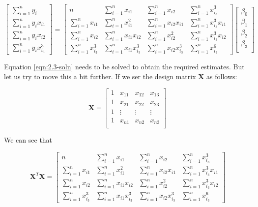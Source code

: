 \documentclass[]{article}
\begin{document}
\begin{equation}
\label{eqn:2.3-soln}
	\begin{bmatrix}
		\sum_{i=1}^{n}y_i \\
		\sum_{i=1}^{n}y_ix_{i1}\\
		\sum_{i=1}^{n}y_ix_{i2}\\
		\sum_{i=1}^{n}y_ix_{i_3}^3
	\end{bmatrix}
	=
	\begin{bmatrix}
		n  							& \sum_{i=1}^{n} x_{i1} 			& \sum_{i=1}^{n} x_{i2} 			& \sum_{i=1}^{n} x_{i_3}^3 \\
		\sum_{i=1}^{n} x_{i1}  		& \sum_{i=1}^{n} x_{i1}^2 			& \sum_{i=1}^{n} x_{i2}x_{i1}		& \sum_{i=1}^{n} x_{i_3}^3x_{i1} \\
		\sum_{i=1}^{n} x_{i2}  		& \sum_{i=1}^{n} x_{i1}x_{i2} 		& \sum_{i=1}^{n} x_{i2}^2 			& \sum_{i=1}^{n} x_{i_3}^3x_{i2} \\
		\sum_{i=1}^{n} x_{i_3}^3	& \sum_{i=1}^{n} x_{i1}x_{i_3}^3 	& \sum_{i=1}^{n} x_{i2}x_{i_3}^3 	& \sum_{i=1}^{n} x_{i_3}^6
	\end{bmatrix}
	\begin{bmatrix}
		\beta_0\\
		\beta_1\\
		\beta_2\\
		\beta_3\\
	\end{bmatrix}
\end{equation}


\noindent Equation \ref{eqn:2.3-soln} needs to be solved to obtain the required estimates. But let us try to move this a bit further. If we ser the design matrix $\textbf{X}$ as follows:

$$
\textbf{X}
=
\begin{bmatrix}
1	& x_{11}	& x_{12}	& x_{13} \\
1	& x_{21}	& x_{22}	& x_{23} \\
1	& \vdots	& \vdots	& \vdots \\
1	& x_{n1}	& x_{n2}	& x_{n3} \\
\end{bmatrix}
$$

\noindent We can see that

$$
\textbf{X}^T \textbf{X}
=
\begin{bmatrix}
	n  							& \sum_{i=1}^{n} x_{i1} 			& \sum_{i=1}^{n} x_{i2} 			& \sum_{i=1}^{n} x_{i_3}^3 \\
	\sum_{i=1}^{n} x_{i1}  		& \sum_{i=1}^{n} x_{i1}^2 			& \sum_{i=1}^{n} x_{i2}x_{i1}		& \sum_{i=1}^{n} x_{i_3}^3x_{i1} \\
	\sum_{i=1}^{n} x_{i2}  		& \sum_{i=1}^{n} x_{i1}x_{i2} 		& \sum_{i=1}^{n} x_{i2}^2 			& \sum_{i=1}^{n} x_{i_3}^3x_{i2} \\
	\sum_{i=1}^{n} x_{i_3}^3	& \sum_{i=1}^{n} x_{i1}x_{i_3}^3 	& \sum_{i=1}^{n} x_{i2}x_{i_3}^3 	& \sum_{i=1}^{n} x_{i_3}^6
\end{bmatrix}
$$
\end{document}
